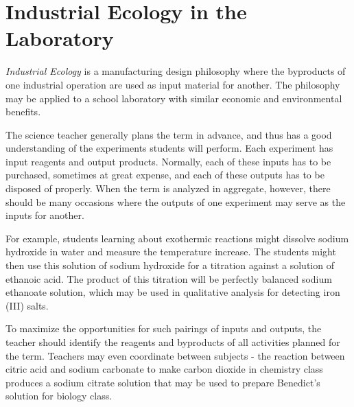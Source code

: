 \chapter{Industrial Ecology in the Laboratory}

\textit{Industrial Ecology} is a manufacturing design philosophy 
where the byproducts of one industrial operation 
are used as input material for another. 
The philosophy may be applied to a school laboratory 
with similar economic and environmental benefits.

The science teacher generally plans the term in advance, 
and thus has a good understanding of the experiments students will perform. 
Each experiment has input reagents and output products. 
Normally, 
each of these inputs has to be purchased, 
sometimes at great expense, 
and each of these outputs has to be disposed of properly. 
When the term is analyzed in aggregate, 
however, 
there should be many occasions where the outputs of one experiment 
may serve as the inputs for another.

For example, 
students learning about exothermic reactions might 
dissolve sodium hydroxide in water and measure the temperature increase. 
The students might then use this solution 
of sodium hydroxide for a titration against a solution of ethanoic acid. 
The product of this titration will be 
perfectly balanced sodium ethanoate solution, 
which may be used in qualitative analysis for detecting iron (III) salts.

To maximize the opportunities for such pairings of inputs and outputs, 
the teacher should identify the reagents and byproducts of 
all activities planned for the term. 
Teachers may even coordinate between subjects - 
the reaction between citric acid and sodium carbonate 
to make carbon dioxide in chemistry class 
produces a sodium citrate solution that may be used 
to prepare Benedict's solution for biology class.
